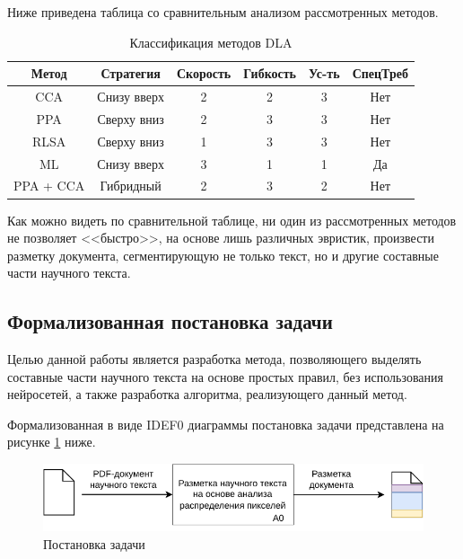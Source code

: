 Ниже приведена таблица со сравнительным анализом рассмотренных методов.

\begin{table}[H]
    \centering
    \caption{Классификация методов DLA}
    \label{tab:table}
    \begin{tabular}{|c|c|c|c|c|c|}
        \hline
        \textbf{Метод} & \textbf{Стратегия} & \textbf{Скорость} & \textbf{Гибкость} & \textbf{Ус-ть} & \textbf{СпецТреб} \\ \hline
        CCA        & Снизу вверх & 2 & 2 & 3 & Нет \\ \hline
        PPA        & Сверху вниз & 2 & 3 & 3 & Нет \\ \hline
        RLSA       & Сверху вниз & 1 & 3 & 3 & Нет \\ \hline
        ML         & Снизу вверх & 3 & 1 & 1 & Да \\ \hline
        PPA + CCA  & Гибридный   & 2 & 3 & 2 & Нет \\ \hline
    \end{tabular}
\end{table}

Как можно видеть по сравнительной таблице, ни один из рассмотренных методов не позволяет <<быстро>>, на основе лишь различных эвристик, произвести разметку документа, сегментирующую не только текст, но и другие составные части научного текста.

\newpage

\subsection{Формализованная постановка задачи}


Целью данной работы является разработка метода, позволяющего выделять составные части научного текста на основе простых правил, без использования нейросетей, а также разработка алгоритма, реализующего данный метод.

Формализованная в виде IDEF0 диаграммы постановка задачи представлена на рисунке \ref{fig:a0} ниже.

\begin{figure}[H]
	\centering
	\includegraphics[width=\textwidth]{diag/a0-pres.pdf}
	\caption{Постановка задачи}
	\label{fig:a0}
\end{figure}

